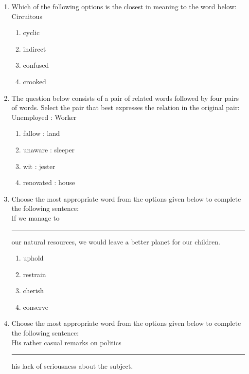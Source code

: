 \documentclass[journal]{IEEEtran}
\begin{document}
\begin{enumerate}
    \item Which of the following options is the closest in meaning to the word below:\\
    Circuitous
    
		\begin{multicols}{4}
			\begin{enumerate}
				\item cyclic
				\item indirect
				\item confused
				\item crooked
			\end{enumerate}
		\end{multicols}

    \item The question below consists of a pair of related words followed by four pairs of words. Select the pair that best expresses the relation in the original pair:\\
    Unemployed : Worker

    \begin{multicols}{4}
       \begin{enumerate}
            \item fallow : land
            \item unaware : sleeper
            \item wit : jester
            \item renovated : house
        \end{enumerate}
    \end{multicols}
  
    \item Choose the most appropriate word from the options given below to complete the following sentence:\\
    If we manage to \rule{1cm}{0.15mm} our natural resources, we would leave a better planet for our children.

    \begin{multicols}{4}
        \begin{enumerate}
            \item uphold
            \item restrain
            \item cherish
            \item conserve
        \end{enumerate}
    \end{multicols}

    \item Choose the most appropriate word from the options given below to complete the following sentence:\\
    His rather casual remarks on politics \rule{1cm}{0.15mm} his lack of seriousness about the subject.


\end{enumerate}
\end{document}
